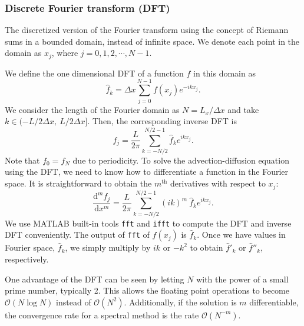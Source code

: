 \subsubsection{Discrete Fourier transform (DFT)}
The discretized version of the Fourier transform using the concept of Riemann sums in a bounded domain, instead of infinite space. 
We denote each point in the domain as $x_j$, where $j = 0,1,2, \cdots, N-1$. 
\par
We define the one dimensional DFT of a function $f$ in this domain \cite{trefethen_spectral_2000} as 
\begin{equation}
\hat{f}_k = \Delta x \sum_{j =0}^{N-1}f(x_j) e^{-i k x_j}.
\label{eq_dft}
\end{equation}
We consider the length of the Fourier domain as $N = L_x /\Delta x$ and take $k \in (-L/2 \Delta x, \  L/2 \Delta x]$. Then, the corresponding inverse DFT is
\begin{equation}
f_j = \frac{L}{2\pi} \sum_{k = -N/2}^{N/2-1} \hat{f}_k e^{i k x_j}.
\label{eq_inv_dft}
\end{equation}
Note that $f_0 = f_N$ due to periodicity. 
To solve the advection-diffusion equation using the DFT, we need to know how to differentiate a function in the Fourier space. 
It is straightforward to obtain the $m^{\text{th}}$ derivatives with respect to $x_j$: 
\begin{equation}
\frac{\text{d}^m f_j}{\text{d}x^m} = \frac{L}{2\pi}  \sum_{k = -N/2}^{N/2-1} (ik)^m  \ \hat{f}_k e^{ikx_j}.
\label{eq_dft_diff}
\end{equation}
We use MATLAB built-in tools \verb+fft+ and \verb+ifft+ to compute the DFT and inverse DFT conveniently.
The output of \verb+fft+ of $f(x_j)$ is $\hat{f}_k$. Once we have values in Fourier space, $\hat{f}_k$, we simply multiply by $ik$ or $-k^2$ to obtain $\hat{f}'_k$ or $\hat{f}''_k$, respectively. 
\par
One advantage of the DFT can be seen by letting $N$ with the power of a small prime number, typically 2. This allows the floating point operations to become $\mathcal{O}(N \log N)$ instead of $\mathcal{O}(N^2)$. Additionally, if the solution is $m$ differentiable, the convergence rate for a spectral method is the rate $\mathcal{O}(N^{-m})$. 
